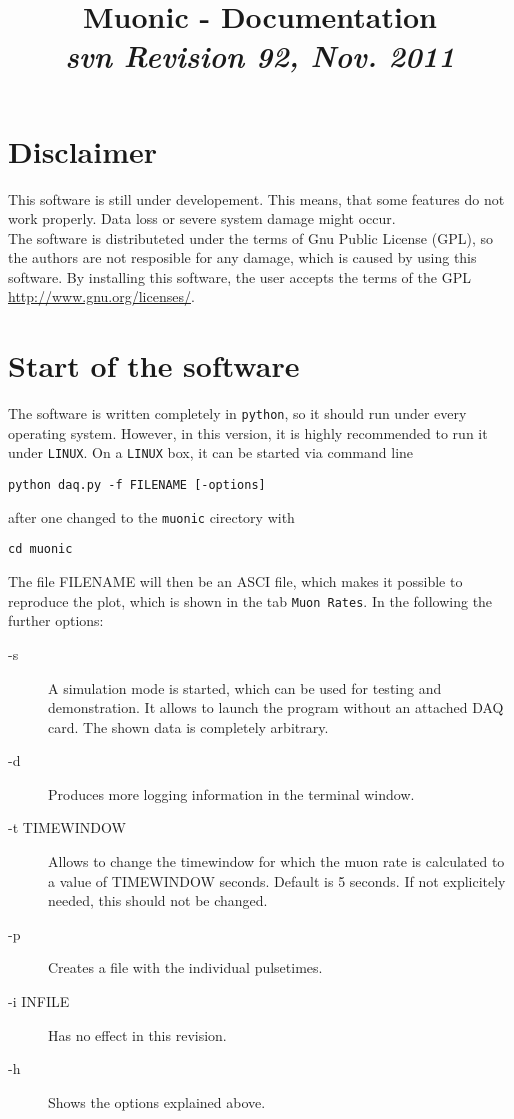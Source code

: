 \documentclass[a4paper,12pt]{article}
\begin{document}
\title{Muonic - Documentation\\ {\small\emph{svn Revision 92, Nov. 2011}}}
\date{}
\maketitle
\tableofcontents

\section{Disclaimer}

This software is still under developement. This means, that some features do not work properly. Data loss or severe system damage might occur.\\
The software is distributeted under the terms of Gnu Public License (GPL), so the authors are not resposible for any damage, which is caused by using this software. By installing this software, the user accepts the terms of the GPL \url{http://www.gnu.org/licenses/}.

\section{Start of the software}

The software is written completely in \verb|python|, so it should run under every operating system. However, in this version, it is highly recommended to run it under \verb|LINUX|.
On a \verb|LINUX| box, it can be started via command line 
\begin{center}
 \verb|python daq.py -f FILENAME [-options]|
\end{center}
after one changed to the \verb|muonic| cirectory with
\begin{center}
\verb|cd muonic|
\end{center}
The file FILENAME will then be an ASCI file, which makes it possible to reproduce the plot, which is shown in the tab \verb|Muon Rates|.
In the following the further options:
\begin{description}
\item[-s] A simulation mode is started, which can be used for testing and demonstration. It allows to launch the program without an attached DAQ card. The shown data is completely arbitrary.


\item[-d] Produces more logging information in the terminal window. 

\item[-t TIMEWINDOW] Allows to change the timewindow for which the muon rate is calculated to a value of TIMEWINDOW seconds. Default is 5 seconds. If not explicitely needed, this should not be changed.


\item[-p] Creates a file with the individual pulsetimes.


\item[-i INFILE] Has no effect in this revision.

\item[-h] Shows the options explained above. 
\end{description}
\end{document}
